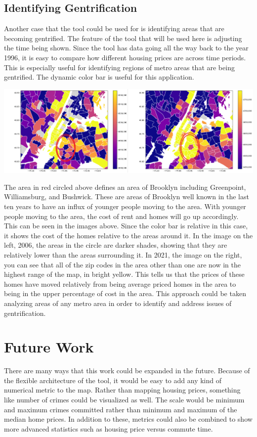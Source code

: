 \documentclass{article}
\begin{document}
\subsection{Identifying Gentrification}
Another case that the tool could be used for is identifying areas that are becoming gentrified. The feature of the tool that will be used here is adjusting the time being shown. Since the tool has data going all the way back to the year 1996, it is easy to compare how different housing prices are across time periods. This is especially useful for identifying regions of metro areas that are being gentrified. The dynamic color bar is useful for this application.


\begin{center}
\includegraphics[scale=0.3]{2006_2021_nyc.png} 
\end{center}


The area in red circled above defines an area of Brooklyn including Greenpoint, Williamsburg, and Bushwick. These are areas of Brooklyn well known in the last ten years to have an influx of younger people moving to the area. With younger people moving to the area, the cost of rent and homes will go up accordingly. This can be seen in the images above. Since the color bar is relative in this case, it shows the cost of the homes relative to the areas around it. In the image on the left, 2006, the areas in the circle are darker shades, showing that they are relatively lower than the areas surrounding it. In 2021, the image on the right, you can see that all of the zip codes in the area other than one are now in the highest range of the map, in bright yellow. This tells us that the prices of these homes have moved relatively from being average priced homes in the area to being in the upper percentage of cost in the area. This approach could be taken analyzing areas of any metro area in order to identify and address issues of gentrification.


\section{Future Work}
There are many ways that this work could be expanded in the future. Because of the flexible architecture of the tool, it would be easy to add any kind of numerical metric to the map. Rather than mapping housing prices, something like number of crimes could be visualized as well. The scale would be minimum and maximum crimes committed rather than minimum and maximum of the median home prices. In addition to these, metrics could also be combined to show more advanced statistics such as housing price versus commute time.
\end{document}
